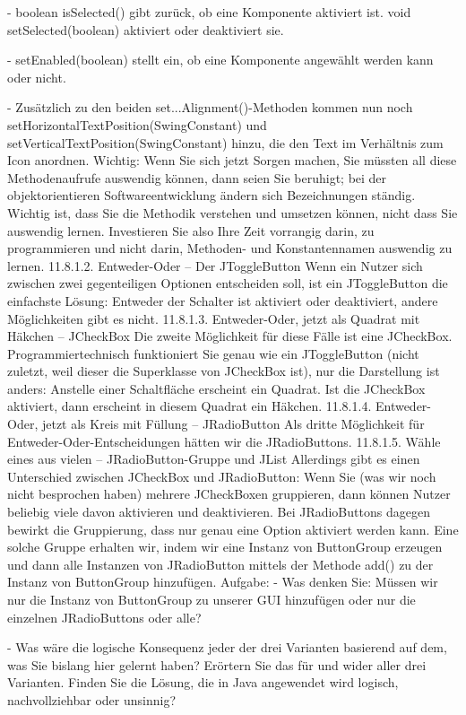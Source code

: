 -	boolean isSelected() gibt zurück, ob eine Komponente aktiviert ist. void setSelected(boolean) aktiviert oder deaktiviert sie.

-	setEnabled(boolean) stellt ein, ob eine Komponente angewählt werden kann oder nicht.

-	Zusätzlich zu den beiden set...Alignment()-Methoden kommen nun noch setHorizontalTextPosition(SwingConstant) und setVerticalTextPosition(SwingConstant) hinzu, die den Text im Verhältnis zum Icon anordnen.
Wichtig: Wenn Sie sich jetzt Sorgen machen, Sie müssten all diese Methodenaufrufe auswendig können, dann seien Sie beruhigt; bei der objektorientieren Softwareentwicklung ändern sich Bezeichnungen ständig. Wichtig ist, dass Sie die Methodik verstehen und umsetzen können, nicht dass Sie auswendig lernen. Investieren Sie also Ihre Zeit vorrangig darin, zu programmieren und nicht darin, Methoden- und Konstantennamen auswendig zu lernen.
11.8.1.2.	Entweder-Oder – Der JToggleButton
Wenn ein Nutzer sich zwischen zwei gegenteiligen Optionen entscheiden soll, ist ein JToggleButton die einfachste Lösung: Entweder der Schalter ist aktiviert oder deaktiviert, andere Möglichkeiten gibt es nicht.
11.8.1.3.	Entweder-Oder, jetzt als Quadrat mit Häkchen – JCheckBox
Die zweite Möglichkeit für diese Fälle ist eine JCheckBox. Programmiertechnisch funktioniert Sie genau wie ein JToggleButton (nicht zuletzt, weil dieser die Superklasse von JCheckBox ist), nur die Darstellung ist anders: Anstelle einer Schaltfläche erscheint ein Quadrat. Ist die JCheckBox aktiviert, dann erscheint in diesem Quadrat ein Häkchen.
11.8.1.4.	Entweder-Oder, jetzt als Kreis mit Füllung – JRadioButton
Als dritte Möglichkeit für Entweder-Oder-Entscheidungen hätten wir die JRadioButtons. 
11.8.1.5.	Wähle eines aus vielen – JRadioButton-Gruppe und JList
Allerdings gibt es einen Unterschied zwischen JCheckBox und JRadioButton: Wenn Sie (was wir noch nicht besprochen haben) mehrere JCheckBoxen gruppieren, dann können Nutzer beliebig viele davon aktivieren und deaktivieren. Bei JRadioButtons dagegen bewirkt die Gruppierung, dass nur genau eine Option aktiviert werden kann.
Eine solche Gruppe erhalten wir, indem wir eine Instanz von ButtonGroup erzeugen und dann alle Instanzen von JRadioButton mittels der Methode add() zu der Instanz von ButtonGroup hinzufügen.
Aufgabe:
-	Was denken Sie: Müssen wir nur die Instanz von ButtonGroup zu unserer GUI hinzufügen oder nur die einzelnen JRadioButtons oder alle?

-	Was wäre die logische Konsequenz jeder der drei Varianten basierend auf dem, was Sie bislang hier gelernt haben? Erörtern Sie das für und wider aller drei Varianten. Finden Sie die Lösung, die in Java angewendet wird logisch, nachvollziehbar oder unsinnig?

